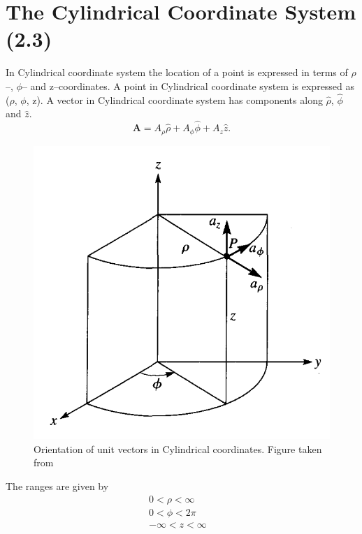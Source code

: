 \documentclass[12pt,a4paper]{article}
\begin{document}
\section{The Cylindrical Coordinate System (2.3)}
In Cylindrical coordinate system the location of a point is expressed in terms of $\rho$--, $\phi$-- and z--coordinates. A point in Cylindrical coordinate system is expressed as ($\rho$, $\phi$, z). A vector in Cylindrical coordinate system has components along $\hat \rho$, $\hat \phi$ and $\hat z$.
\begin{equation}
\textbf{A}=A_\rho\hat \rho+A_\phi\hat \phi+ A_z\hat z.
\end{equation}
\begin{figure}[H]
\centering
\includegraphics[scale=0.45]{Figure2-1S.png}
\caption{Orientation of unit vectors in Cylindrical coordinates. Figure taken from~\cite[Figure 2.1, page 29]{Sadiku}}
\label{Unit-vectors-cylindrical-coordinates}
\end{figure}
The ranges are given by
\begin{equation*}
\begin{split}
0 < \rho < \infty&\\
0 < \phi < 2\pi&\\
-\infty < z < \infty&\\
\end{split}
\end{equation*}
\end{document}

